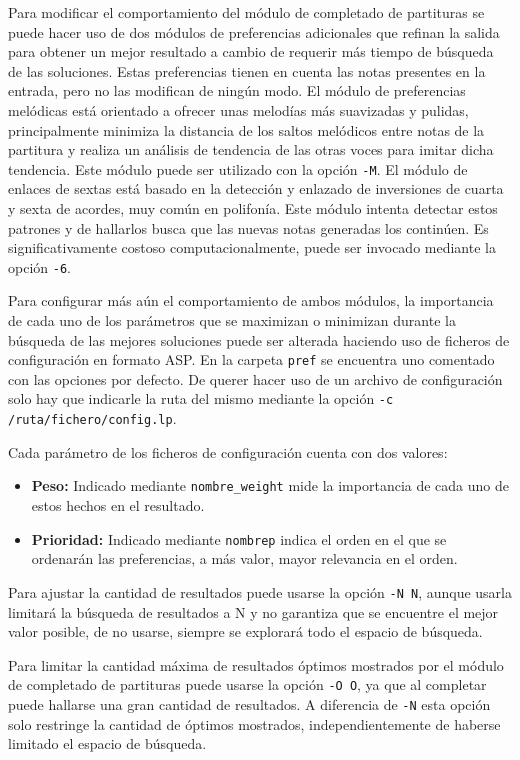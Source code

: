 Para modificar el comportamiento del módulo de completado de partituras se puede hacer uso de dos módulos de preferencias adicionales que refinan la salida para obtener un mejor resultado a cambio de requerir más tiempo de búsqueda de las soluciones. Estas preferencias tienen en cuenta las notas presentes en la entrada, pero no las modifican de ningún modo. 
El módulo de preferencias melódicas está orientado a ofrecer unas melodías más suavizadas y pulidas, principalmente minimiza la distancia de los saltos melódicos entre notas de la partitura y realiza un análisis de tendencia de las otras voces para imitar dicha tendencia. Este módulo puede ser utilizado con la opción \texttt{-M}.
El módulo de enlaces de sextas está basado en la detección y enlazado de inversiones de cuarta y sexta de acordes, muy común en polifonía. Este módulo intenta detectar estos patrones y de hallarlos busca que las nuevas notas generadas los continúen. Es significativamente costoso computacionalmente, puede ser invocado mediante la opción \texttt{-6}.

Para configurar más aún el comportamiento de ambos módulos, la importancia de cada uno de los parámetros que se maximizan o minimizan durante la búsqueda de las mejores soluciones puede ser alterada haciendo uso de ficheros de configuración en formato ASP. En la carpeta \texttt{pref} se encuentra uno comentado con las opciones por defecto. De querer hacer uso de un archivo de configuración solo hay que indicarle la ruta del mismo mediante la opción \texttt{-c /ruta/fichero/config.lp}. 

Cada parámetro de los ficheros de configuración cuenta con dos valores:
\begin{itemize}
	\item \textbf{Peso:} Indicado mediante \texttt{nombre\_weight} mide la importancia de cada uno de estos hechos en el resultado.
	\item \textbf{Prioridad:} Indicado mediante \texttt{nombrep} indica el orden en el que se ordenarán las preferencias, a más valor, mayor relevancia en el orden.
\end{itemize}

Para ajustar la cantidad de resultados puede usarse la opción \texttt{-N N}, aunque usarla limitará la búsqueda de resultados a N y no garantiza que se encuentre el mejor valor posible, de no usarse, siempre se explorará todo el espacio de búsqueda.

Para limitar la cantidad máxima de resultados óptimos mostrados por el módulo de completado de partituras puede usarse la opción \texttt{-O O}, ya que al completar puede hallarse una gran cantidad de resultados. A diferencia de \texttt{-N} esta opción solo restringe la cantidad de óptimos mostrados, independientemente de haberse limitado el espacio de búsqueda.

